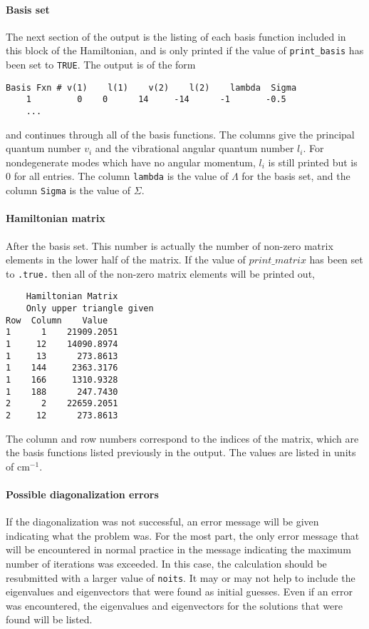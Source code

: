 \documentclass{article}
\newcommand{\wn}{cm$^{-1}$}
\begin{document}
\paragraph{Basis set}
The next section of the output is the listing of each basis function
included in this block of the Hamiltonian, and is only printed if the
value of {\tt print\_basis} has been set to {\tt TRUE}. The output is of
the form
\begin{verbatim}
Basis Fxn #	v(1)	l(1)	v(2)	l(2)	lambda	Sigma	
    1         0	   0	  14	 -14	  -1	   -0.5	
	...	
\end{verbatim}
and continues through all of the basis functions. The columns give the
principal quantum number $v_i$ and the vibrational angular quantum
number $l_i$. For nondegenerate modes which have no angular momentum, $l_i$ is still printed but is 0 for all entries. The column {\tt lambda} is the value of $\Lambda $ for
the basis set, and the column {\tt Sigma} is the value of
$\Sigma $.

\paragraph{Hamiltonian matrix}
After the basis set. This
number is actually the number of non-zero matrix elements in the lower
half of the matrix. If the value of $print\_matrix$ has been set to
{\tt .true.} then all of the non-zero matrix elements will be printed
out,
\begin{verbatim}
	Hamiltonian Matrix
	Only upper triangle given
Row  Column    Value
1      1    21909.2051
1     12    14090.8974
1     13      273.8613
1    144     2363.3176
1    166     1310.9328
1    188      247.7430
2      2    22659.2051
2     12      273.8613
\end{verbatim}
The column and row numbers correspond to the indices of the matrix,
which are the basis functions listed previously in the output. The
values are listed in units of \wn .

\paragraph{Possible diagonalization errors}
If the diagonalization was not successful, an error message will be
given indicating what the problem was. For the most part, the only
error message that will be encountered in normal practice in the
message indicating the maximum number of iterations was exceeded. In
this case, the calculation should be resubmitted with a larger value
of {\tt noits}. It may or may not help to include the eigenvalues and
eigenvectors that were found as initial guesses. Even if an error was
encountered, the eigenvalues and eigenvectors for the solutions that
were found will be listed.
\end{document}
